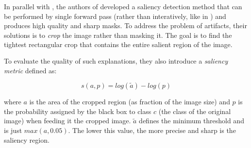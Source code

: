 \documentclass[12pt, twoside, a4paper]{report}
\begin{document}
In parallel with \cite{fong}, the authors of \cite{real_time_image_saliency} developed a saliency detection method that can be performed by single forward pass (rather than interatively, like in \cite{obj-detectors}) and produces high quality and sharp masks. To address the problem of artifacts, their solutions is to \textit{crop} the image rather than masking it. The goal is to find the tightest rectangular crop that contains the entire salient region of the image.



To evaluate the quality of such explanations, they also introduce a \textit{saliency metric} defined as:

\begin{equation}\label{eqn:saliency-metric}
s(a,p) = log(\widetilde{a}) - log(p)
\end{equation}

where $a$ is the area of the cropped region (as fraction of the image size) and $p$ is the probability assigned by the black box to class $c$ (the class of the original image) when feeding it the cropped image. $\widetilde{a}$ defines the minimum threshold and is just $max(a,0.05)$. The lower this value, the more precise and sharp is the saliency region.
\end{document}
